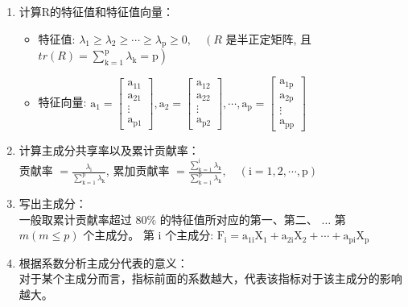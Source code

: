 \documentclass {article}
\begin{document}
\begin{enumerate}
		\item 计算R的特征值和特征值向量：
		\begin{itemize}
			\item 特征值: $\lambda_1 \geq \lambda_2 \geq \cdots \geq \lambda_{\mathrm{p}} \geq 0, \quad\left({R}\right.$ 是半正定矩阵, 且 $\left.{tr}(R)=\sum_{\mathrm{k}=1}^{\mathrm{p}} \lambda_{\mathrm{k}}=\mathrm{p}\right)$
			
			\item 特征向量: $\mathrm{a}_1=\left[\begin{array}{c}\mathrm{a}_{11} \\ \mathrm{a}_{21} \\ \vdots \\ \mathrm{a}_{\mathrm{p} 1}\end{array}\right], \mathrm{a}_2=\left[\begin{array}{c}\mathrm{a}_{12} \\ \mathrm{a}_{22} \\ \vdots \\ \mathrm{a}_{\mathrm{p} 2}\end{array}\right], \cdots, \mathrm{a}_{\mathrm{p}}=\left[\begin{array}{c}\mathrm{a}_{1 \mathrm{p}} \\ \mathrm{a}_{2 \mathrm{p}} \\ \vdots \\ \mathrm{a}_{\mathrm{pp}}\end{array}\right]$
		\end{itemize}
		
		\item 计算主成分共享率以及累计贡献率：\\
		贡献率 $=\frac{\lambda_{\mathrm{i}}}{\sum_{\mathrm{k}=1}^{\mathrm{p}} \lambda_{\mathrm{k}}}$, 累加贡献率 $=\frac{\sum_{\mathrm{k}=1}^{\mathrm{i}} \lambda_{\mathrm{k}}}{\sum_{\mathrm{k}=1}^{\mathrm{p}} \lambda_{\mathrm{k}}}, \quad(\mathrm{i}=1,2, \cdots, \mathrm{p})$
		
		\item 写出主成分：\\
		一般取累计贡献率超过 $80 \%$ 的特征值所对应的第一、第二、 $\ldots$ 第 $m(m \leq p)$ 个主成分。
		第 $\mathrm{i}$ 个主成分: $\mathrm{F}_{\mathrm{i}}=\mathrm{a}_{1 \mathrm{i}} \mathrm{X}_1+\mathrm{a}_{2 \mathrm{i}} \mathrm{X}_2+\cdots+\mathrm{a}_{\mathrm{pi}} \mathrm{X}_{\mathrm{p}}$
		
		\item 根据系数分析主成分代表的意义：\\
		对于某个主成分而言，指标前面的系数越大，代表该指标对于该主成分的影响越大。
		
	\end{enumerate}
	
\end{document}
